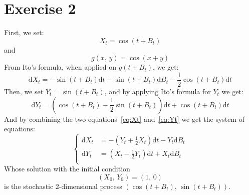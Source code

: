 \documentclass{article}
\theoremstyle{plain}
\theoremstyle{definition}
\theoremstyle{definition}
\theoremstyle{remark}
\newcommand{\diff}{\mathrm{d}}
\begin{document}
        \section{Exercise 2}
        First, we set:
        \begin{equation*}
            X_{t} = \cos \left(t + B_{t}\right)
        \end{equation*}
        and
        \begin{equation*}
            g \left(x,\,y\right) = \cos \left(x + y\right)
        \end{equation*}
        From Ito's formula, when applied on \(g \left(t+B_{t}\right)\), we get:
        \begin{equation}
            \label{eq:Xt}
            \diff  X_{t} = -\sin \left(t + B_{t}\right) \diff t -\sin \left(t + B_{t}\right) \diff  B_{t} - \frac{1}{2} \cos \left(t + B_{t}\right) \diff t
        \end{equation}
        Then, we set \(Y_{t} = \sin \left(t+B_{t}\right)\), and by applying Ito's formula for \(Y_{t}\) we get:
        \begin{equation}
            \label{eq:Yt}
            \diff Y_{t} = \left(\cos \left(t + B_{t}\right) - \frac{1}{2}\sin \left(t+B_{t}\right)\right)\diff t + \cos \left(t + B_{t}\right)\diff t
        \end{equation}
        And by combining the two equations~\eqref{eq:Xt} and~\eqref{eq:Yt} we get the system of equations:
        \begin{equation*}
            \begin{cases}
            \diff X_{t} &= -\left(Y_{t} + \frac{1}{2}X_{t}\right)\diff t -Y_{t}\diff B_{t} \\
            \diff Y_{t} &= \left(X_{t} - \frac{1}{2}Y_{t}\right)\diff t +X_{t}\diff B_{t} \\
        \end{cases}
        \end{equation*}
        Whose solution with the initial condition
        \[
            \left(X_{0},\,Y_{0}\right) = \left(1,\,0\right)
        \]
        is the stochastic 2-dimensional process \(\left(\cos \left(t + B_{t}\right),\,\sin \left(t + B_{t}\right)\right)\).
\end{document}
